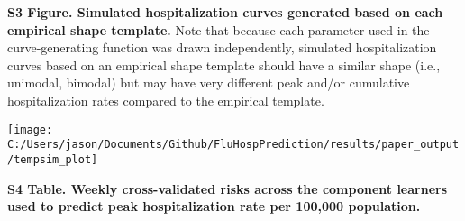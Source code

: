 \documentclass[10pt,letterpaper]{article}
\begin{document}
\newpage

\noindent \textbf{S3 Figure. Simulated hospitalization curves generated
based on each empirical shape template.} Note that because each
parameter used in the curve-generating function was drawn independently,
simulated hospitalization curves based on an empirical shape template
should have a similar shape (i.e., unimodal, bimodal) but may have very
different peak and/or cumulative hospitalization rates compared to the
empirical template.

\texttt{[image: C:/Users/jason/Documents/Github/FluHospPrediction/results/paper\_output/tempsim\_plot]}

\newpage

\noindent \textbf{S4 Table. Weekly cross-validated risks across the
component learners used to predict peak hospitalization rate per 100,000
population.}
\end{document}
